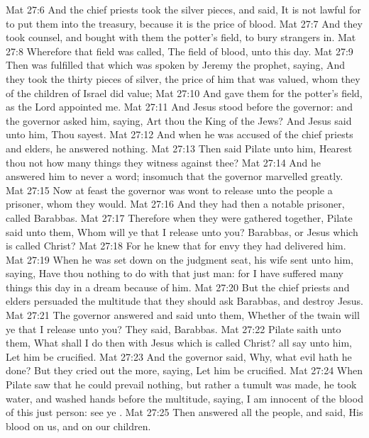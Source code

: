 \vs Mat 27:6 And the chief priests took the silver pieces, and said, It is not lawful for to put them into the treasury, because it is the price of blood.
\vs Mat 27:7 And they took counsel, and bought with them the potter's field, to bury strangers in.
\vs Mat 27:8 Wherefore that field was called, The field of blood, unto this day.
\vs Mat 27:9 Then was fulfilled that which was spoken by Jeremy the prophet, saying, And they took the thirty pieces of silver, the price of him that was valued, whom they of the children of Israel did value;
\vs Mat 27:10 And gave them for the potter's field, as the Lord appointed me.
\vs Mat 27:11 And Jesus stood before the governor: and the governor asked him, saying, Art thou the King of the Jews? And Jesus said unto him, Thou sayest.
\vs Mat 27:12 And when he was accused of the chief priests and elders, he answered nothing.
\vs Mat 27:13 Then said Pilate unto him, Hearest thou not how many things they witness against thee?
\vs Mat 27:14 And he answered him to never a word; insomuch that the governor marvelled greatly.
\vs Mat 27:15 Now at  feast the governor was wont to release unto the people a prisoner, whom they would.
\vs Mat 27:16 And they had then a notable prisoner, called Barabbas.
\vs Mat 27:17 Therefore when they were gathered together, Pilate said unto them, Whom will ye that I release unto you? Barabbas, or Jesus which is called Christ?
\vs Mat 27:18 For he knew that for envy they had delivered him.
\vs Mat 27:19 When he was set down on the judgment seat, his wife sent unto him, saying, Have thou nothing to do with that just man: for I have suffered many things this day in a dream because of him.
\vs Mat 27:20 But the chief priests and elders persuaded the multitude that they should ask Barabbas, and destroy Jesus.
\vs Mat 27:21 The governor answered and said unto them, Whether of the twain will ye that I release unto you? They said, Barabbas.
\vs Mat 27:22 Pilate saith unto them, What shall I do then with Jesus which is called Christ?  all say unto him, Let him be crucified.
\vs Mat 27:23 And the governor said, Why, what evil hath he done? But they cried out the more, saying, Let him be crucified.
\vs Mat 27:24 When Pilate saw that he could prevail nothing, but  rather a tumult was made, he took water, and washed  hands before the multitude, saying, I am innocent of the blood of this just person: see ye .
\vs Mat 27:25 Then answered all the people, and said, His blood  on us, and on our children.
